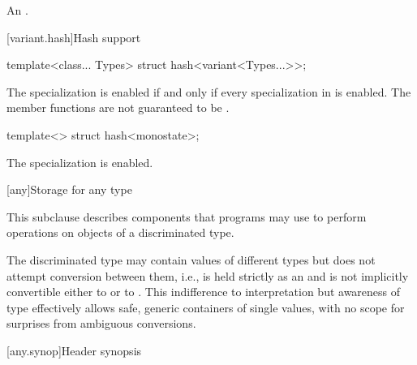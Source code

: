 \begin{itemdescr}
\pnum
\returns
An  \ntbs{}.
\end{itemdescr}

[variant.hash]{Hash support}

%
\begin{itemdecl}
template<class... Types> struct hash<variant<Types...>>;
\end{itemdecl}

\begin{itemdescr}
\pnum
The specialization  is enabled
if and only if every specialization in  is enabled.
The member functions are not guaranteed to be .
\end{itemdescr}

%
\begin{itemdecl}
template<> struct hash<monostate>;
\end{itemdecl}

\begin{itemdescr}
\pnum
The specialization is enabled.
\end{itemdescr}


[any]{Storage for any type}

\pnum
This subclause describes components that \Cpp{} programs may use to perform operations on objects of a discriminated type.

\pnum
\begin{note}
The discriminated type may contain values of different types but does not attempt conversion between them,
i.e.,  is held strictly as an  and is not implicitly convertible either to  or to .
This indifference to interpretation but awareness of type effectively allows safe, generic containers of single values, with no scope for surprises from ambiguous conversions.
\end{note}

[any.synop]{Header  synopsis}

%

